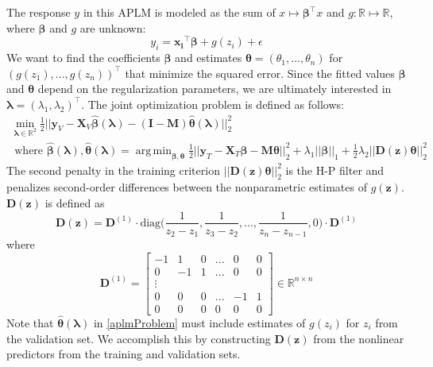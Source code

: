 \documentclass[10pt,letterpaper]{article}
\DeclareMathOperator*{\argmin}{arg\,min}
\begin{document}
The response $y$ in this APLM is modeled as the sum of $x \mapsto \boldsymbol \beta^\top x $ and $g: \mathbb{R} \mapsto \mathbb{R}$, where $\boldsymbol \beta$ and $g$ are unknown:
\begin{equation}
y_i = \boldsymbol{x_i}^\top \boldsymbol{\beta} + g(z_i) + \epsilon
\end{equation}
We want to find the coefficients $\boldsymbol{\beta}$ and estimates $\boldsymbol{\theta} = (\theta_1, ..., \theta_n)$ for $(g(z_1), ..., g(z_n))^\top$ that minimize the squared error. Since the fitted values $\boldsymbol{\beta}$ and $\boldsymbol{\theta}$ depend on the regularization parameters, we are ultimately interested in $\boldsymbol\lambda = (\lambda_1, \lambda_2)^\top$. The joint optimization problem is defined as follows:
\begin{equation}
\begin{array}{c}
\min_{\boldsymbol\lambda \in \mathbb{R}^2} \frac{1}{2}
\bigl\lvert\bigl\lvert
\boldsymbol{y}_V
- \boldsymbol{X}_V\hat{\boldsymbol{\beta}}(\boldsymbol{\lambda})
- (\boldsymbol{I} - \boldsymbol{M}) \hat{\boldsymbol{\theta}}(\boldsymbol{\lambda})
\bigl\rvert\bigl\rvert^2_2 \\
\text{ where }
\hat{\boldsymbol{\beta}}(\boldsymbol{\lambda}),
\hat{\boldsymbol{\theta}}(\boldsymbol{\lambda}) =
\argmin_{\boldsymbol{\beta}, \boldsymbol{\theta}}
\frac{1}{2} \bigl\lvert\bigl\lvert
\boldsymbol{y}_T
- \boldsymbol{X}_T\boldsymbol{\beta}
- \boldsymbol{M} \boldsymbol{\theta} \bigl\rvert\bigl\rvert^2_2
+ \lambda_1 \lvert\lvert \boldsymbol{\beta}
\rvert \rvert_1
+ \frac{1}{2} \lambda_2 \lvert\lvert \boldsymbol{D}(\boldsymbol{z}) \boldsymbol{\theta} \rvert \rvert_2^2
\end{array}
\label{aplmProblem}
\end{equation}
The second penalty in the training criterion $\lvert\lvert \boldsymbol{D}(\boldsymbol{z}) \boldsymbol{\theta} \rvert \rvert_2^2$ is the H-P filter and penalizes second-order differences between the nonparametric estimates of $g(\boldsymbol{z})$. $\boldsymbol{D}(\boldsymbol{z})$ is defined as
\begin{equation}
\boldsymbol{D}(\boldsymbol{z}) = \boldsymbol{D}^{(1)} \cdot
\text{diag} \big ( \frac{1}{z_{2} - z_1}, \frac{1}{z_{3} - z_2}, ... , \frac{1}{z_{n} - z_{n-1}}, 0 \big )
\cdot \boldsymbol{D}^{(1)}
\end{equation}
where
\begin{equation}
\boldsymbol{D}^{(1)} = 
\begin{bmatrix}
-1 & 1 & 0 & ... & 0 & 0 \\
0 & -1 & 1 & ... & 0 & 0 \\
\vdots \\
0 & 0 & 0 & ... & -1 & 1 \\
0 &0 & 0 &  0  &  0 & 0
\end{bmatrix}
\in
\mathbb{R}^{n\times n}
\end{equation}
Note that $\hat{\boldsymbol{\theta}}(\boldsymbol{\lambda})$ in \eqref{aplmProblem} must include estimates of $g(z_i)$ for  $z_i$ from the validation set. We accomplish this by constructing $\boldsymbol{D}(\boldsymbol{z})$ from the nonlinear predictors from the training and validation sets.
\end{document}
